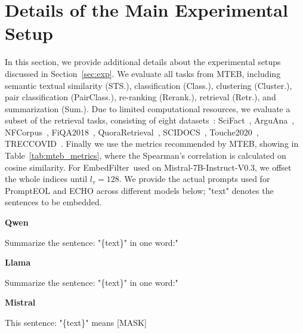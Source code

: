 \documentclass[sigconf]{acmart}
\newcommand{\name}{EmbedFilter}
\begin{document}

\balance



\appendix

\clearpage
\newpage

\section{Details of the Main Experimental Setup}
\label{sec:main_setup}
In this section, we provide additional details about the experimental setups discussed in Section~\ref{sec:exp}.
We evaluate all tasks from MTEB, including semantic textual similarity (STS.), classification (Class.), clustering (Cluster.), pair classification (PairClass.), re-ranking (Rerank.), retrieval (Retr.), and summarization (Sum.). 
Due to limited computational resources, we evaluate a subset of the retrieval tasks, consisting of eight datasets~\cite{mteb}: SciFact~\cite{scifact}, ArguAna~\cite{arguana}, NFCorpus~\cite{Nfcorpus}, FiQA2018~\cite{fiqa}, QuoraRetrieval~\cite{beir}, SCIDOCS~\cite{scidocs}, Touche2020~\cite{touche}, TRECCOVID~\cite{treccovid}. 
Finally we use the metrics recommended by MTEB, showing in Table~\ref{tab:mteb_metrics}, where the Spearman’s correlation is calculated on cosine similarity. 
For \name\ used on Mistral-7B-Instruct-V0.3, we offset the whole indices until \(l_\tau=128\).
We provide the actual prompts used for PromptEOL and ECHO across different models below; "text" denotes the sentences to be embedded.
\begin{tcolorbox}[
    colback=white,
    arc=0mm,
    title=PromptEOL,
    boxrule=0.5pt, %
    left = 0mm, right = 0mm,
    top=1mm, bottom=1mm
]
    \label{box:PromptEOL}
    \textbf{Qwen}
    \begin{tcolorbox}[colback=black!3, boxrule=0.2pt, arc=1mm, top=0.2mm, bottom=0.2mm, left = 0mm, right = 0mm, before skip=2mm, after skip=2mm]
        Summarize the sentence: "\{text\}" in one word:"
    \end{tcolorbox}

    \textbf{Llama}
    \begin{tcolorbox}[colback=black!3, boxrule=0.2pt, arc=1mm, top=0.2mm, bottom=0.2mm, left = 0mm, right = 0mm, before skip=2mm, after skip=2mm]
        Summarize the sentence: "\{text\}" in one word:"
    \end{tcolorbox}
    
    \textbf{Mistral}
    \begin{tcolorbox}[colback=black!3, boxrule=0.2pt, arc=1mm, top=0.2mm, bottom=0.2mm, left = 0mm, right = 0mm, before skip=2mm, after skip=2mm]
        This sentence: "\{text\}" means [MASK]
    \end{tcolorbox}
\end{tcolorbox}
\end{document}
